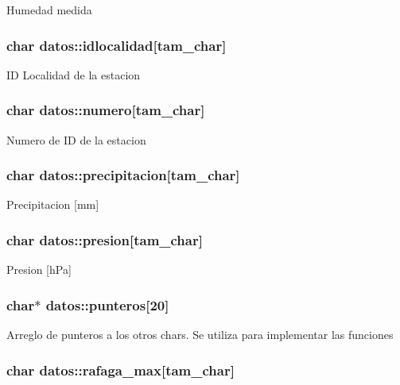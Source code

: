 Humedad medida \hypertarget{structdatos_a927e448958bc1d5945ee80dc5f0bf220}{
\subsubsection[{idlocalidad}]{\setlength{\rightskip}{0pt plus 5cm}char datos\-::idlocalidad\mbox{[}tam\-\_\-char\mbox{]}}}\label{structdatos_a927e448958bc1d5945ee80dc5f0bf220}
I\-D Localidad de la estacion \hypertarget{structdatos_a76d4b3ae2b7f06c453196625bbfdce21}{
\subsubsection[{numero}]{\setlength{\rightskip}{0pt plus 5cm}char datos\-::numero\mbox{[}tam\-\_\-char\mbox{]}}}\label{structdatos_a76d4b3ae2b7f06c453196625bbfdce21}
Numero de I\-D de la estacion \hypertarget{structdatos_a895ca1f2cbf77067b75fcbb84fb1171c}{
\subsubsection[{precipitacion}]{\setlength{\rightskip}{0pt plus 5cm}char datos\-::precipitacion\mbox{[}tam\-\_\-char\mbox{]}}}\label{structdatos_a895ca1f2cbf77067b75fcbb84fb1171c}
Precipitacion \mbox{[}mm\mbox{]} \hypertarget{structdatos_a3a2cc12174c5270d5f097f6e3456f429}{
\subsubsection[{presion}]{\setlength{\rightskip}{0pt plus 5cm}char datos\-::presion\mbox{[}tam\-\_\-char\mbox{]}}}\label{structdatos_a3a2cc12174c5270d5f097f6e3456f429}
Presion \mbox{[}h\-Pa\mbox{]} \hypertarget{structdatos_a25e0937de3764a91d0aca3a93f5bd9ab}{
\subsubsection[{punteros}]{\setlength{\rightskip}{0pt plus 5cm}char$\ast$ datos\-::punteros\mbox{[}20\mbox{]}}}\label{structdatos_a25e0937de3764a91d0aca3a93f5bd9ab}
Arreglo de punteros a los otros chars. Se utiliza para implementar las funciones \hypertarget{structdatos_aee38928b36bde1b1ddede66cf1bea915}{
\subsubsection[{rafaga\-\_\-max}]{\setlength{\rightskip}{0pt plus 5cm}char datos\-::rafaga\-\_\-max\mbox{[}tam\-\_\-char\mbox{]}}}\label{structdatos_aee38928b36bde1b1ddede66cf1bea915}
